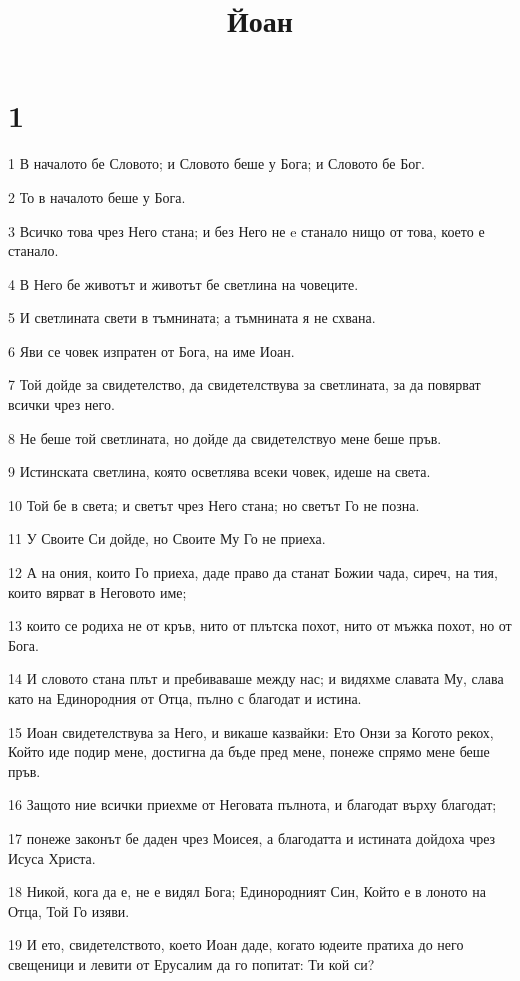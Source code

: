 

\title{Йоан}


\chapter{1}

\par 1 В началото бе Словото; и Словото беше у Бога; и Словото бе Бог.
\par 2 То в началото беше у Бога.
\par 3 Всичко това чрез Него стана; и без Него не e станало нищо от това, което е станало.
\par 4 В Него бе животът и животът бе светлина на човеците.
\par 5 И светлината свети в тъмнината; а тъмнината я не схвана.
\par 6 Яви се човек изпратен от Бога, на име Иоан.
\par 7 Той дойде за свидетелство, да свидетелствува за светлината, за да повярват всички чрез него.
\par 8 Не беше той светлината, но дойде да свидетелствуо мене беше пръв.
\par 9 Истинската светлина, която осветлява всеки човек, идеше на света.
\par 10 Той бе в света; и светът чрез Него стана; но светът Го не позна.
\par 11 У Своите Си дойде, но Своите Му Го не приеха.
\par 12 А на ония, които Го приеха, даде право да станат Божии чада, сиреч, на тия, които вярват в Неговото име;
\par 13 които се родиха не от кръв, нито от плътска похот, нито от мъжка похот, но от Бога.
\par 14 И словото стана плът и пребиваваше между нас; и видяхме славата Му, слава като на Единородния от Отца, пълно с благодат и истина.
\par 15 Иоан свидетелствува за Него, и викаше казвайки: Ето Онзи за Когото рекох, Който иде подир мене, достигна да бъде пред мене, понеже спрямо мене беше пръв.
\par 16 Защото ние всички приехме от Неговата пълнота, и благодат върху благодат;
\par 17 понеже законът бе даден чрез Моисея, а благодатта и истината дойдоха чрез Исуса Христа.
\par 18 Никой, кога да е, не е видял Бога; Единородният Син, Който е в лоното на Отца, Той Го изяви.
\par 19 И ето, свидетелството, което Иоан даде, когато юдеите пратиха до него свещеници и левити от Ерусалим да го попитат: Ти кой си?
